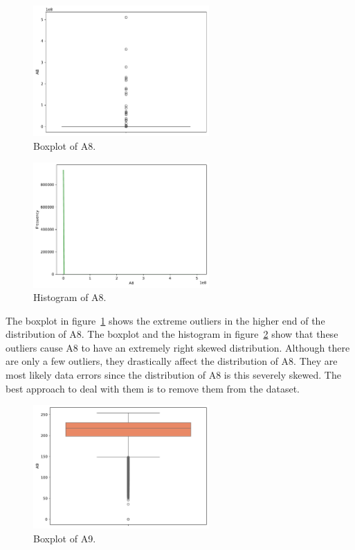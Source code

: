 \documentclass[11pt]{report}
\begin{document}
\begin{figure}[H]
    \centering
    \includegraphics[width=0.6\textwidth]{images/A8_boxplot.pdf}
    \caption{Boxplot of A8.}
    \label{fig:a8_boxplot}
\end{figure}

\begin{figure}[H]
    \centering
    \includegraphics[width=0.6\textwidth]{images/A8_histplot.pdf}
    \caption{Histogram of A8.}
    \label{fig:a8_histplot}
\end{figure}

The boxplot in figure~\ref{fig:a8_boxplot} shows the extreme outliers in the higher end of the distribution of A8. The boxplot and the histogram in figure~\ref{fig:a8_histplot} show that these outliers cause A8 to have an extremely right skewed distribution. Although there are only a few outliers, they drastically affect the distribution of A8. They are most likely data errors since the distribution of A8 is this severely skewed. The best approach to deal with them is to remove them from the dataset.

\begin{figure}[H]
    \centering
    \includegraphics[width=0.6\textwidth]{images/A9_boxplot.pdf}
    \caption{Boxplot of A9.}
    \label{fig:a9_boxplot}
\end{figure}
\end{document}
